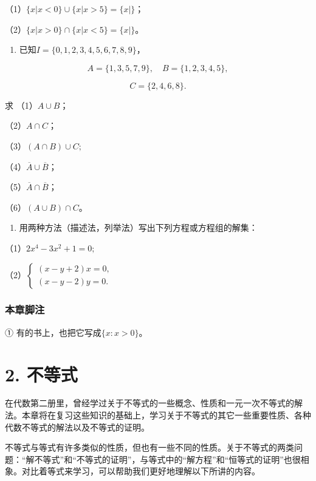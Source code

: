 （1）\(\{x|x < 0\} \cup \{x|x > 5\} = \{x|\}\)；

（2）\(\{x|x > 0\} \cap \{x|x < 5\} = \{x|\}\)。

\begin{enumerate}[start=3]
\item
  已知\(I = \{0, 1, 2, 3, 4, 5, 6, 7, 8, 9\}\)，
\end{enumerate}

\[
A = \{1, 3, 5, 7, 9 \}, \quad B = \{1, 2, 3, 4, 5 \},
\]

\[
C = \{2, 4, 6, 8 \}.
\]

求 （1）\(A \cup B\)；

（2）\(A \cap C\)；

（3）\((A\cap B)\cup C;\)

（4）\(\overline{A} \cup \overline{B}\)；

（5）\(\overline{A} \cap \overline{B}\)；

（6）\((A \cup B) \cap C\)。

\begin{enumerate}[start=4]
\item
  用两种方法（描述法，列举法）写出下列方程或方程组的解集：
\end{enumerate}

（1）\(2x^{4} - 3x^{2} + 1 = 0;\)

（2）\(\left\{ \begin{array}{l} (x - y + 2)x = 0, \\ (x - y - 2)y = 0. \end{array} \right.\)

\subsection{本章脚注}

① 有的书上，也把它写成\(\{x: x > 0\}\)。

\chapter{2. 不等式}

在代数第二册里，曾经学过关于不等式的一些概念、性质和一元一次不等式的解法。本章将在复习这些知识的基础上，学习关于不等式的其它一些重要性质、各种代数不等式的解法以及不等式的证明。

不等式与等式有许多类似的性质，但也有一些不同的性质。关于不等式的两类问题：``解不等式''和``不等式的证明''，与等式中的``解方程''和``恒等式的证明''也很相象。对比着等式来学习，可以帮助我们更好地理解以下所讲的内容。

